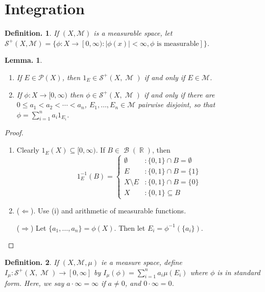 \documentclass[11pt, a4paper]{memoir}
\DeclareMathOperator{\R}{{\mathbb{R}}}
\theoremstyle{change}
\newtheorem{lemma}[theorem]{Lemma.}
\theoremstyle{plain}
\theoremstyle{nonumberplain}
\newtheorem{definition}{Definition.}
\newtheorem{proof}{Proof}
\DeclareMathOperator{\M}{{\mathcal{M}}}
\DeclareMathOperator{\B}{{\mathcal{B}}}
\numberwithin{equation}{section}
\begin{document}
\section{Integration}
\begin{definition}
    If $(X,\mathcal{M})$ is a measurable space, let $\mathcal{S}^+(X,\mathcal{M})=\{\phi:X\to[0,\infty):|\phi(x)|<\infty,\phi\text{ is measurable}]\}$.
\end{definition}
\begin{lemma}
    \begin{enumerate}[nolistsep, label=(\roman*)]
        \item If $E\in\mathcal{P}(X)$, then $1_E\in\mathcal{S}^+(X,\M)$ if and only if $E\in\mathcal{M}$. %
        \item If $\phi:X\to[0,\infty)$ then $\phi\in\mathcal{S}^+(X,\M)$ if and only if there are $0\leq a_1<a_2<\cdots<a_n$, $E_1,\ldots,E_n\in\mathcal{M}$ pairwise disjoint, so that $\phi=\sum_{i=1}^n a_i 1_{E_i}$.
    \end{enumerate}
\end{lemma}
\begin{proof}
    \begin{enumerate}[nolistsep, label=(\roman*)]
        \item Clearly $1_E(X)\subseteq[0,\infty)$. %
            If $B\in\B(\R)$, then
            \begin{equation*}
                1_E^{-1}(B)=\begin{cases}
                    \emptyset&:\{0,1\}\cap B=\emptyset\\
                    E&:\{0,1\}\cap B=\{1\}\\
                    X\setminus E&:\{0,1\}\cap B=\{0\}\\
                    X&:\{0,1\}\subseteq B
                \end{cases}
            \end{equation*}
        \item ($\Leftarrow$).
            Use (i) and arithmetic of measurable functions.

            ($\Rightarrow$) Let $\{a_1,\ldots,a_n\}=\phi(X)$.
            Then let $E_i=\phi^{-1}(\{a_i\})$.
    \end{enumerate}
\end{proof}
\begin{definition}
    If $(X,\mathcal{M},\mu)$ ie a measure space, define $I_\mu:\mathcal{S}^+(X,\M)\to[0,\infty]$ by $I_\mu(\phi)=\sum_{i=1}^n a_i\mu(E_i)$ where $\phi$ is in standard form.
    Here, we say $a\cdot\infty=\infty$ if $a\neq 0$, and $0\cdot\infty=0$.
\end{definition}
\end{document}
